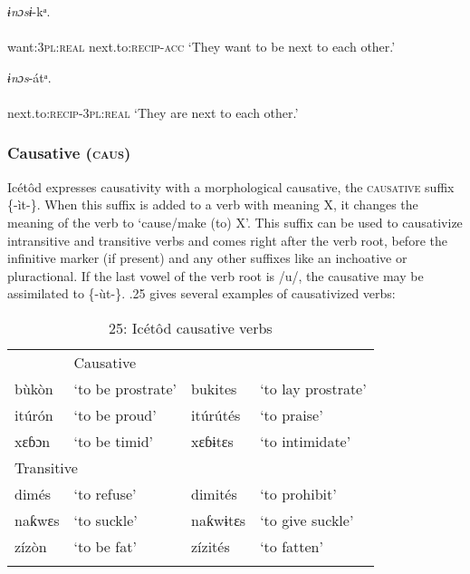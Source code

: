 \ea\label{ex:}
\textit{ɨnɔsɨ}{}-kᵃ. \\
    \\
want:\textsc{3pl:real}   next.to:\textsc{recip-acc}
\glt ‘They want to be next to each other.’ 
\z




\ea\label{ex:}
\textit{ɨnɔs}{}-átᵃ. \\
    \\
next.to:\textsc{recip-3pl:real}
\glt ‘They are next to each other.’ 
\z




\subsubsection{Causative (\textsc{caus})}

Icétôd expresses causativity with a morphological causative, the \textsc{causative} suffix \{-ìt-\}. When this suffix is added to a verb with meaning X, it changes the meaning of the verb to ‘cause/make (to) X’. This suffix can be used to causativize intransitive and transitive verbs and comes right after the verb root, before the infinitive marker (if present) and any other suffixes like an inchoative or pluractional. If the last vowel of the verb root is /u/, the causative may be assimilated to \{-ùt-\}. .25 gives several examples of causativized verbs:


\begin{table}
\caption{25: Icétôd causative verbs}
\label{tab:8}


\begin{tabularx}{\textwidth}{XXXX}
\lsptoprule

\multicolumn{2}{X}{Intransitive} & \multicolumn{2}{X}{Causative}\\
bùkòn & ‘to be prostrate’ & bukites & ‘to lay prostrate’\\
itúrón & ‘to be proud’ & itúrútés & ‘to praise’\\
xɛɓɔn & ‘to be timid’ & xɛɓɨtɛs & ‘to intimidate’\\
\multicolumn{2}{X}{Transitive} &  & \\
dimés & ‘to refuse’ & dimités & ‘to prohibit’\\
naƙwɛs & ‘to suckle’ & naƙwɨtɛs & ‘to give suckle’\\
zízòn & ‘to be fat’ & zízités & ‘to fatten’\\
\lspbottomrule
\end{tabularx}
\end{table}



